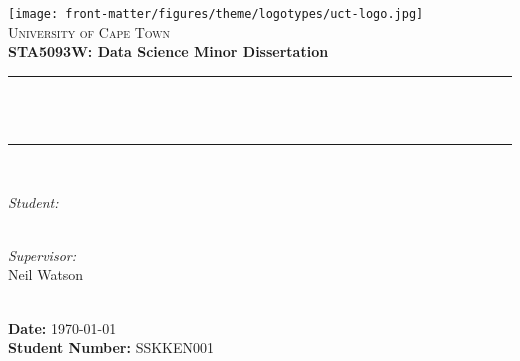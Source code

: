 \documentclass[parskip=half,12pt,twoside]{scrbook}
\begin{document}
\frontmatter

\begin{titlepage}
    \centering
    \vspace*{0.5 cm}
    \texttt{[image: front-matter/figures/theme/logotypes/uct-logo.jpg]}\\[1cm]
    \textsc{\LARGE University of Cape Town}\\[0.5cm]
    \textbf{\Large STA5093W: Data Science Minor Dissertation}\\[0.5cm]
    \rule{\linewidth}{0.2mm}\\[0.4 cm]
    {\huge \bfseries \thetitle}\\
    \rule{\linewidth}{0.2mm}\\[1.5cm]
    \begin{minipage}{0.4\textwidth}
        \begin{flushleft} \large
		\emph{Student:}\\
		\theauthor \\            
	\end{flushleft}
    \end{minipage}
    \begin{minipage}{0.4\textwidth}
        \begin{flushright} \large
            \emph{Supervisor:} \\
            Neil Watson            
        \end{flushright}
    \end{minipage}\\[2 cm]
    
    \textbf{Date:} \today \\
    \textbf{Student Number:} SSKKEN001\\
\end{titlepage}

\tableofcontents
\listoffigures
\listoftables

\mainmatter




\backmatter

\appendix
% 
% 



\end{document}
